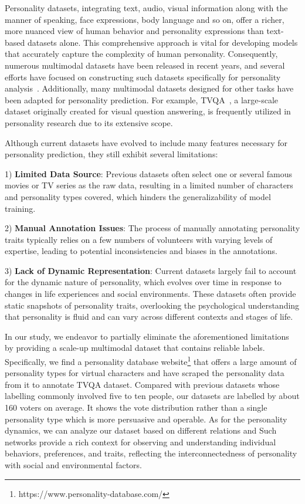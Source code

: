 Personality datasets, integrating text, audio, visual information along with the manner of speaking, face expressions, body language and so on, offer a richer, more nuanced view of human behavior and personality expressions than text-based datasets alone. This comprehensive approach is vital for developing models that accurately capture the complexity of human personality. Consequently, numerous multimodal datasets have been released in recent years, and several efforts have focused on constructing such datasets specifically for personality analysis~\cite{9407599,Junior_2021,Jiang_2020,chen2022cped}. Additionally, many multimodal datasets designed for other tasks have been adapted for personality prediction. For example, TVQA~\cite{Lei_2018}, a large-scale dataset originally created for visual question answering, is frequently utilized in personality research due to its extensive scope.

Although current datasets have evolved to include many features necessary for personality prediction, they still exhibit several limitations: 

1) \textbf{Limited Data Source}: Previous datasets often select one or several famous movies or TV series as the raw data, resulting in a limited number of characters and personality types covered, which hinders the generalizability of model training.

2) \textbf{Manual Annotation Issues}: The process of manually annotating personality traits typically relies on a few numbers of volunteers with varying levels of expertise, leading to potential inconsistencies and biases in the annotations.

3) \textbf{Lack of Dynamic Representation}: Current datasets largely fail to account for the dynamic nature of personality, which evolves over time in response to changes in life experiences and social environments. These datasets often provide static snapshots of personality traits, overlooking the psychological understanding that personality is fluid and can vary across different contexts and stages of life.


In our study, we endeavor to partially eliminate the aforementioned limitations by providing a scale-up multimodal dataset that contains reliable labels. Specifically, we find a personality database website\footnote[1]{https://www.personality-database.com/} that offers a large amount of personality types for virtual characters and \cite{zhu2023personalityaware} have scraped the personality data from it to annotate TVQA dataset. Compared with previous datasets whose labelling commonly involved five to ten people, our datasets are labelled by about 160 voters on average. It shows the vote distribution rather than a single personality type which is more persuasive and operable. As for the personality dynamics, we can analyze our dataset based on different relations and  Such networks provide a rich context for observing and understanding individual behaviors, preferences, and traits, reflecting the interconnectedness of personality with social and environmental factors.


